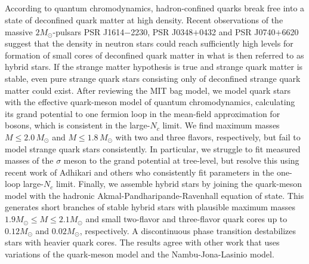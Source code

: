 \subsection*{}

According to quantum chromodynamics,
hadron-confined quarks break free into a state of deconfined quark matter at high density.
Recent observations of the massive $2 M_\odot$-pulsars PSR J1614$-$2230, PSR J0348$+$0432 and PSR J0740$+$6620
suggest that the density in neutron stars could reach sufficiently high levels
for formation of small cores of deconfined quark matter in what is then referred to as hybrid stars.
If the strange matter hypothesis is true and strange quark matter is stable,
even pure strange quark stars consisting only of deconfined strange quark matter could exist.
After reviewing the MIT bag model,
we model quark stars with the effective quark-meson model of quantum chromodynamics,
calculating its grand potential to one fermion loop in the mean-field approximation for bosons,
which is consistent in the large-$N_c$ limit.
We find maximum masses $M \leq 2.0 \, M_\odot$ and $M \leq 1.8 \, M_\odot$ with two and three flavors, respectively,
but fail to model strange quark stars consistently.
In particular, we struggle to fit measured masses 
of the $\sigma$ meson to the grand potential at tree-level,
but resolve this using recent work of Adhikari and others who consistently fit parameters in the one-loop large-$N_c$ limit.
Finally, we assemble hybrid stars by joining the quark-meson model with the hadronic Akmal-Pandharipande-Ravenhall equation of state.
This generates short branches of stable hybrid stars with plausible maximum masses $1.9 M_\odot \leq M \leq 2.1 M_\odot$
and small two-flavor and three-flavor quark cores up to $0.12 M_\odot$ and $0.02 M_\odot$, respectively.
A discontinuous phase transition destabilizes stars with heavier quark cores.
The results agree with other work that uses variations of the quark-meson model and the Nambu-Jona-Lasinio model.%
\tikzexternaldisable%
%
\tikzexternalenable%


